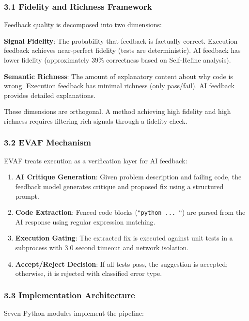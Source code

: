 
\subsubsection{3.1 Fidelity and Richness Framework}

Feedback quality is decomposed into two dimensions:

\textbf{Signal Fidelity}: The probability that feedback is factually correct. Execution feedback achieves near-perfect fidelity (tests are deterministic). AI feedback has lower fidelity (approximately 39\% correctness based on Self-Refine analysis).

\textbf{Semantic Richness}: The amount of explanatory content about why code is wrong. Execution feedback has minimal richness (only pass/fail). AI feedback provides detailed explanations.

These dimensions are orthogonal. A method achieving high fidelity and high richness requires filtering rich signals through a fidelity check.

\subsubsection{3.2 EVAF Mechanism}

EVAF treats execution as a verification layer for AI feedback:

\begin{enumerate}
\item \textbf{AI Critique Generation}: Given problem description and failing code, the feedback model generates critique and proposed fix using a structured prompt.
\item \textbf{Code Extraction}: Fenced code blocks (``\texttt{python ... }``) are parsed from the AI response using regular expression matching.
\item \textbf{Execution Gating}: The extracted fix is executed against unit tests in a subprocess with 3.0 second timeout and network isolation.
\item \textbf{Accept/Reject Decision}: If all tests pass, the suggestion is accepted; otherwise, it is rejected with classified error type.
\end{enumerate}

\subsubsection{3.3 Implementation Architecture}

Seven Python modules implement the pipeline:


